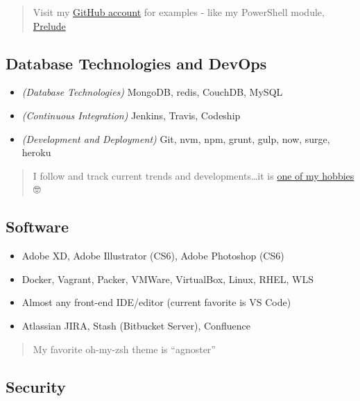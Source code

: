 \documentclass[10pt]{article}
\def\tightlist{}
\begin{document}
\begin{quote}
Visit my \href{https://github.com/jhwohlgemuth}{GitHub account} for
examples - like my PowerShell module,
\href{https://github.com/jhwohlgemuth/pwsh-prelude}{Prelude}
\end{quote}

\hypertarget{database-technologies-and-devops}{%
\subsection{Database Technologies and
DevOps}\label{database-technologies-and-devops}}

\begin{itemize}
\tightlist
\item
  \emph{(Database Technologies)} MongoDB, redis, CouchDB, MySQL
\item
  \emph{(Continuous Integration)} Jenkins, Travis, Codeship
\item
  \emph{(Development and Deployment)} Git, nvm, npm, grunt, gulp, now,
  surge, heroku
\end{itemize}

\begin{quote}
I follow and track current trends and developments\ldots it is
\href{https://twitter.com/jhwohlgemuth}{one of my hobbies} 🤓
\end{quote}

\hypertarget{software}{%
\subsection{Software}\label{software}}

\begin{itemize}
\tightlist
\item
  Adobe XD, Adobe Illustrator (CS6), Adobe Photoshop (CS6)
\item
  Docker, Vagrant, Packer, VMWare, VirtualBox, Linux, RHEL, WLS
\item
  Almost any front-end IDE/editor (current favorite is VS Code)
\item
  Atlassian JIRA, Stash (Bitbucket Server), Confluence
\end{itemize}

\begin{quote}
My favorite oh-my-zsh theme is ``agnoster''
\end{quote}

\hypertarget{security}{%
\subsection{Security}\label{security}}
\end{document}
